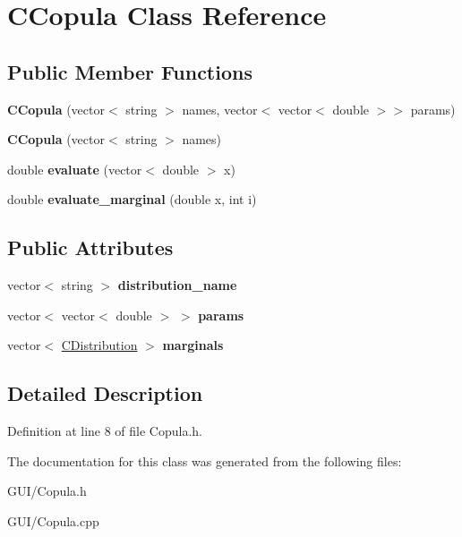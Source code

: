\hypertarget{class_c_copula}{}\section{C\+Copula Class Reference}
\label{class_c_copula}
\subsection*{Public Member Functions}
\begin{DoxyCompactItemize}
\item 
\mbox{\label{class_c_copula_a315a4fc48fb1824affc8a666ae55467a}} 
{\bfseries C\+Copula} (vector$<$ string $>$ names, vector$<$ vector$<$ double $>$$>$ params)
\item 
\mbox{\label{class_c_copula_af79ca00dcabfd97f1e45a87a2ac8ca6c}} 
{\bfseries C\+Copula} (vector$<$ string $>$ names)
\item 
\mbox{\label{class_c_copula_a777de54621ad1ad87655759533d4457b}} 
double {\bfseries evaluate} (vector$<$ double $>$ x)
\item 
\mbox{\label{class_c_copula_a8d29980a398a8769d808244fe6319cdb}} 
double {\bfseries evaluate\+\_\+marginal} (double x, int i)
\end{DoxyCompactItemize}
\subsection*{Public Attributes}
\begin{DoxyCompactItemize}
\item 
\mbox{\label{class_c_copula_ae59fcb2014c60cd3343f718affeda6f2}} 
vector$<$ string $>$ {\bfseries distribution\+\_\+name}
\item 
\mbox{\label{class_c_copula_a40b55eab35808ed4714f9204109fe85e}} 
vector$<$ vector$<$ double $>$ $>$ {\bfseries params}
\item 
\mbox{\label{class_c_copula_a89a28249db6efd7f0f81aed6ace57791}} 
vector$<$ \hyperlink{class_c_distribution}{C\+Distribution} $>$ {\bfseries marginals}
\end{DoxyCompactItemize}


\subsection{Detailed Description}


Definition at line 8 of file Copula.\+h.



The documentation for this class was generated from the following files\+:\begin{DoxyCompactItemize}
\item 
G\+U\+I/Copula.\+h\item 
G\+U\+I/Copula.\+cpp\end{DoxyCompactItemize}

